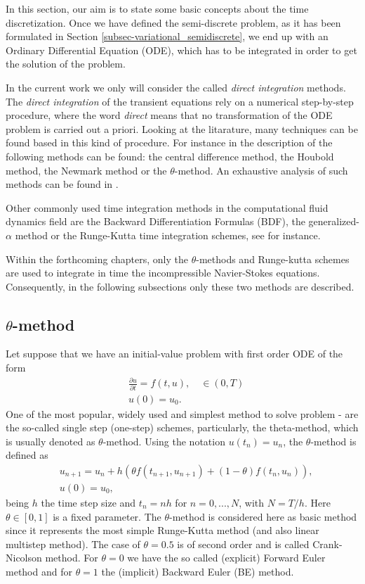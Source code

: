 In this section, our aim is to state some basic concepts about the time discretization. Once we have defined the semi-discrete problem, as it has been formulated in Section \ref{subsec-variational_semidiscrete}, we end up with an Ordinary Differential Equation (ODE), which has to be integrated in order to get the solution of the problem.

In the current work we only will consider the called \textit{direct integration} methods. The \textit{direct integration} of the transient equations rely on a numerical step-by-step procedure, where the word \textit{direct} means that no transformation of the ODE problem is carried out a priori. Looking at the litarature, many techniques can be found based in this kind of procedure. For instance in \cite{bathe_finite_2006} the description of the following methods can be found: the central difference method, the Houbold method, the Newmark method or the $ \theta $-method. An exhaustive analysis of such methods can be found in \cite{belytschko_computational_1983}.

Other commonly used time integration methods in the computational fluid dynamics field are the Backward Differentiation Formulas (BDF), the generalized-$ \alpha $ method or the Runge-Kutta time integration schemes, see \cite{brayton_new_1972, jansen_generalized-alpha_2000, dettmer_analysis_2003,hairer_solving_2008} for instance.

Within the forthcoming chapters, only the $ \theta $-methods and Runge-kutta schemes are used to integrate in time the incompressible Navier-Stokes equations. Consequently, in the following subsections only these two methods are described. 

\subsection{$ \theta $-method}
Let suppose that we have an initial-value problem with first order ODE of the form
\begin{align}
\label{eq-C2_time_ODE}
&\frac{\partial u}{\partial t}=f(t,u),\quad\in(0,T)\\
\label{eq-C2_time_ODE_0}
&u(0)=u_0.
\end{align}
One of the most popular, widely used and simplest method to solve problem - are the so-called single step (one-step) schemes, particularly, the theta-method, which is usually denoted as $ \theta $-method. Using the notation $u(t_n) = u_n$, the $ \theta $-method is defined as
\begin{align*}
\label{eq-C2_time_theta_method}
&u_{n+1} = u_n + h (\theta f(t_{n+1}, u_{n+1}) + (1-\theta )f(t_n,u_n)),\\
&u(0) = u_0,
\end{align*}
being $ h $ the time step size and $ t_n = nh $ for $ n=0,...,N $, with $ N=T/h $. Here $ \theta \in [0, 1] $ is a fixed parameter. The $ \theta $-method is considered here as basic method since it represents the most simple Runge-Kutta method (and also linear multistep method). The case of $ \theta=0.5 $ is of second order and is called Crank-Nicolson method. For $ \theta=0 $ we have the so called (explicit) Forward Euler method and for $ \theta=1 $ the (implicit) Backward Euler (BE) method.

